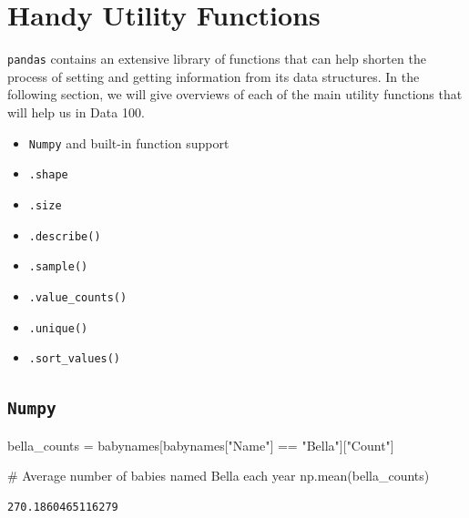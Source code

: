 \documentclass[
  letterpaper,
  DIV=11,
  numbers=noendperiod]{scrreprt}
\newenvironment{Shaded}{\begin{snugshade}}{\end{snugshade}}
\newcommand{\CommentTok}[1]{\textcolor[rgb]{0.37,0.37,0.37}{#1}}
\newcommand{\NormalTok}[1]{\textcolor[rgb]{0.00,0.23,0.31}{#1}}
\newcommand{\OperatorTok}[1]{\textcolor[rgb]{0.37,0.37,0.37}{#1}}
\newcommand{\StringTok}[1]{\textcolor[rgb]{0.13,0.47,0.30}{#1}}
\providecommand{\tightlist}{%
  \setlength{\itemsep}{0pt}\setlength{\parskip}{0pt}}\usepackage{longtable,booktabs,array}
\begin{document}
\hypertarget{handy-utility-functions}{%
\section{Handy Utility Functions}\label{handy-utility-functions}}

\texttt{pandas} contains an extensive library of functions that can help
shorten the process of setting and getting information from its data
structures. In the following section, we will give overviews of each of
the main utility functions that will help us in Data 100.

\begin{itemize}
\tightlist
\item
  \texttt{Numpy} and built-in function support
\item
  \texttt{.shape}
\item
  \texttt{.size}
\item
  \texttt{.describe()}
\item
  \texttt{.sample()}
\item
  \texttt{.value\_counts()}
\item
  \texttt{.unique()}
\item
  \texttt{.sort\_values()}
\end{itemize}

\hypertarget{numpy}{%
\subsection{\texorpdfstring{\texttt{Numpy}}{Numpy}}\label{numpy}}

\begin{Shaded}
\begin{Highlighting}[]
\NormalTok{bella\_counts }\OperatorTok{=}\NormalTok{ babynames[babynames[}\StringTok{"Name"}\NormalTok{] }\OperatorTok{==} \StringTok{"Bella"}\NormalTok{][}\StringTok{"Count"}\NormalTok{]}
\end{Highlighting}
\end{Shaded}

\begin{Shaded}
\begin{Highlighting}[]
\CommentTok{\# Average number of babies named Bella each year}
\NormalTok{np.mean(bella\_counts)}
\end{Highlighting}
\end{Shaded}

\begin{verbatim}
270.1860465116279
\end{verbatim}
\end{document}
